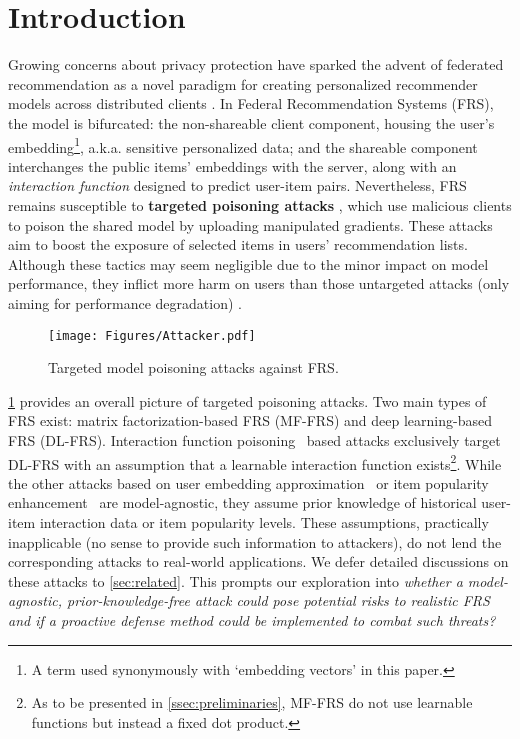 \section{Introduction}
\label{sec:intro}

Growing concerns about privacy protection have sparked the advent of federated recommendation as a novel paradigm for creating personalized recommender models across distributed clients \cite{MintoHLH21,FedRec++,WangYCYZZ22,FedFast}.
In Federal Recommendation Systems (FRS), the model is bifurcated: the non-shareable client component, housing the user's embedding\footnote{A term used synonymously with `embedding vectors' in this paper.}, a.k.a. sensitive personalized data; and the shareable component interchanges the public items' embeddings with the server, along with an \emph{interaction function} designed to predict user-item pairs.
Nevertheless, FRS remains susceptible to \textbf{targeted poisoning attacks} \cite{fedrecattack,pipattack,a-hum}, which use malicious clients to poison the shared model by uploading manipulated gradients. These attacks aim to boost the exposure of selected items in users' recommendation lists. Although these tactics may seem negligible due to the minor impact on model performance, they inflict more harm on users than those untargeted attacks (only aiming for performance degradation) \cite{FL-Defender,CONTRA,FungYB20}.

\begin{figure}[!htbp]
\centering
\texttt{[image: Figures/Attacker.pdf]}
    \caption{Targeted model poisoning attacks against FRS.}
    \label{fig:attacker}
\end{figure}

\cref{fig:attacker} provides an overall picture of targeted poisoning attacks. 
Two main types of FRS exist: matrix factorization-based FRS (MF-FRS) and deep learning-based FRS (DL-FRS).
Interaction function poisoning~\cite{a-hum} based attacks exclusively target DL-FRS with an assumption that a learnable interaction function exists\footnote{As to be presented in \cref{ssec:preliminaries}, MF-FRS do not use learnable functions but instead a fixed dot product.}. While the other attacks based on user embedding approximation~\cite{fedrecattack} or item popularity enhancement~\cite{pipattack} are model-agnostic, they assume prior knowledge of historical user-item interaction data or item popularity levels. These assumptions, practically inapplicable (no sense to provide such information to attackers), do not lend the corresponding attacks to real-world applications. 
We defer detailed discussions on these attacks to \cref{sec:related}.
This prompts our exploration into \emph{whether a model-agnostic, prior-knowledge-free attack could pose potential risks to realistic FRS and if a proactive defense method could be implemented to combat such threats?}

